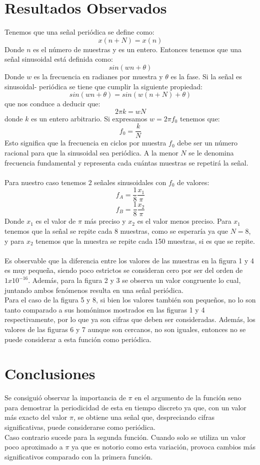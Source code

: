 \documentclass[12pt]{article}
\begin{document}
\section{Resultados Observados}
Tenemos que una señal periódica se define como:
$$x(n+N)=x(n)$$
Donde $n$ es el número de muestras y es un entero. Entonces tenemos que una señal sinusoidal está definida como:
$$sin(wn+\theta)$$
Donde $w$ es la frecuencia en radianes por muestra y $\theta$ es la fase. Si la señal es sinusoidal-
periódica se tiene que cumplir la siguiente propiedad:
$$sin(wn+\theta)=sin(w(n+N)+\theta)$$
que nos conduce a deducir que:
$$2\pi k=wN$$
donde $k$ es un entero arbitrario. Si expresamos $w=2\pi f_0$ tenemos que:
$$f_0=\frac{k}{N}$$
Esto significa que la frecuencia en ciclos por muestra $f_0$ debe ser un número racional para que la sinusoidal sea periódica.
A la menor $N$ se le denomina frecuencia fundamental y representa cada cuántas muestras se repetirá la señal.\\\\
Para nuestro caso tenemos 2 señales sinusoidales con $f_0$ de valores:
$$f_A=\frac{1}{8}\frac{x_1}{\pi}$$
$$f_B=\frac{1}{8}\frac{x_2}{\pi}$$
Donde $x_1$ es el valor de $\pi$ más preciso y $x_2$ es el valor menos preciso. Para $x_1$ tenemos que la señal se repite cada 8 muestras, como se esperaría ya que $N=8$, y para $x_2$ tenemos que la muestra se repite cada 150 muestras, si es que se repite.
\\\\
Es observable que la diferencia entre los valores de las muestras en la figura 1 y 4 es muy pequeña, siendo poco estrictos se consideran cero por ser del orden de $1x10^{-16}$. Además, para la figura 2 y 3 se observa un valor congruente lo cual, juntando ambos fenómenos resulta en una señal periódica.
\\
Para el caso de la figura 5 y 8, si bien los valores también son pequeños, no lo son tanto comparado a sus homónimos mostrados en las figuras 1 y 4 respectivamente, por lo que ya son cifras que deben ser consideradas. Además, los valores de las figuras 6 y 7 aunque son cercanos, no son iguales, entonces no se puede considerar a esta función como periódica.

\section{Conclusiones}
Se consiguió observar la importancia de $\pi$ en el argumento de la función seno para demostrar la periodicidad de esta en tiempo discreto ya que, con un valor más exacto del valor $\pi$, se obtiene una señal que, despreciando cifras significativas, puede considerarse como periódica. 
\\
Caso contrario sucede para la segunda función. Cuando solo se utiliza un valor poco aproximado a $\pi$ ya que es notorio como esta variación, provoca cambios más significativos comparado con la primera función.
\end{document}
